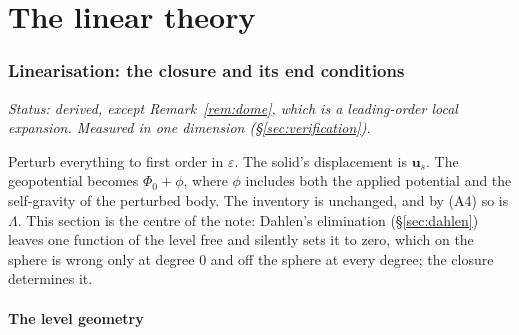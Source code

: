 \documentclass[11pt]{article}
\theoremstyle{definition}
\theoremstyle{remark}
\newcommand{\bu}{\mathbf{u}}
\newcommand{\status}[1]{\noindent\emph{Status: #1}\par\smallskip}
\begin{document}
\part{The linear theory}

\section{Linearisation: the closure and its end conditions}
\label{sec:lin}
\label{sec:general}

\status{derived, except Remark~\ref{rem:dome}, which is a leading-order
local expansion. Measured in one dimension (\S\ref{sec:verification}).}

Perturb everything to first order in $\varepsilon$. The solid's
displacement is $\bu_s$. The geopotential becomes $\Phi_0 + \phi$,
where $\phi$ includes both the applied potential and the self-gravity
of the perturbed body. The inventory is unchanged, and by (A4) so is
$\Lambda$. This section is the centre of the note: Dahlen's
elimination (\S\ref{sec:dahlen}) leaves one function of the level free
and silently sets it to zero, which on the sphere is wrong only at
degree $0$ and off the sphere at every degree; the closure determines
it.

\subsection{The level geometry}
\label{sec:levelgeom}
\end{document}
